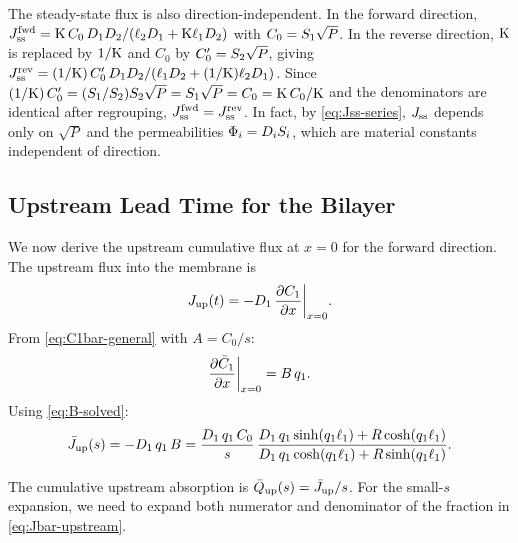 \begin{remark}
The steady-state flux is also direction-independent.
In the forward direction,
$J_{\mathrm{ss}}^{\mathrm{fwd}} = \mathrm{K}\,C_0\,D_{1}D_{2}/(\ell_{2}D_{1}
+ \mathrm{K}\ell_{1}D_{2})$ with $C_0 = S_{1}\sqrt{P}$.
In the reverse direction, $\mathrm{K}$ is replaced by $1/\mathrm{K}$ and $C_0$ by
$C_0' = S_{2}\sqrt{P}$, giving
$J_{\mathrm{ss}}^{\mathrm{rev}} = (1/\mathrm{K})\,C_0'\,D_{1}D_{2}/(\ell_{1}D_{2}
+ (1/\mathrm{K})\ell_{2}D_{1})$.
Since $(1/\mathrm{K})\,C_0' = (S_{1}/S_{2})S_{2}\sqrt{P} = S_{1}\sqrt{P}
= C_0 = \mathrm{K}\,C_0/\mathrm{K}$ and the denominators are identical after
regrouping, $J_{\mathrm{ss}}^{\mathrm{fwd}} = J_{\mathrm{ss}}^{\mathrm{rev}}$.
In fact, by \cref{eq:Jss-series}, $J_{\mathrm{ss}}$ depends only on $\sqrt{P}$ and the
permeabilities $\Phi_i = D_{i}S_{i}$, which are material constants
independent of direction.
\end{remark}

\subsection{Upstream Lead Time for the Bilayer}
\label{sec:two-layer-upstream}

We now derive the upstream cumulative flux at $x = 0$ for the forward
direction.  The upstream flux into the membrane is
\begin{equation}
  J_{\mathrm{up}}(t) = -D_{1}\,\pdv{C_1}{x}\bigg|_{x=0}.
\end{equation}
From \cref{eq:C1bar-general} with $A = C_0/s$:
\begin{equation}
  \pdv{\bar{C}_1}{x}\bigg|_{x=0} = B\,q_1.
\end{equation}
Using \cref{eq:B-solved}:
\begin{equation}
  \label{eq:Jbar-upstream}
  \bar{J}_{\mathrm{up}}(s) = -D_{1}\,q_1\,B
  = \frac{D_{1}\,q_1\,C_0}{s}\,
  \frac{D_{1}\,q_1\sinh(q_1\ell_{1}) + R\cosh(q_1\ell_{1})}
  {D_{1}\,q_1\cosh(q_1\ell_{1}) + R\sinh(q_1\ell_{1})}.
\end{equation}

The cumulative upstream absorption is
$\bar{Q}_{\mathrm{up}}(s) = \bar{J}_{\mathrm{up}}/s$.  For the small-$s$
expansion, we need to expand both numerator and denominator of the fraction in
\cref{eq:Jbar-upstream}.

